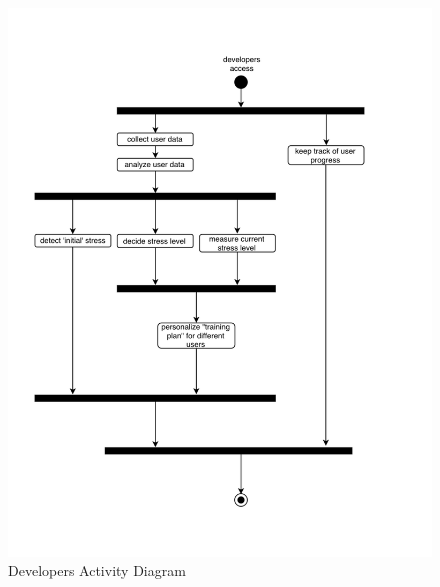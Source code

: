 \begin{figure}[h]
    \centering
    \includegraphics[width=\linewidth]{activity-diagram-developers}
    \caption{Developers Activity Diagram}
    \label{fig:act-div-dev}
\end{figure}